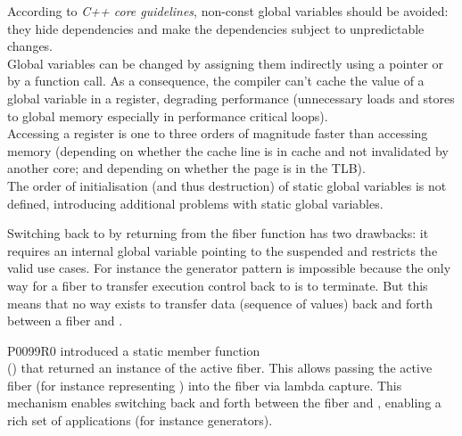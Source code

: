 \label{problem_gpub}

According to \emph{C++ core guidelines}\cite{coreguidlines}, non-const global
variables should be avoided: they hide dependencies and make the
dependencies subject to unpredictable changes.\\
Global variables can be changed by assigning them indirectly using a pointer or
by a function call. As a consequence, the compiler can't cache the value of a
global variable in a register, degrading performance (unnecessary
loads and stores to global memory especially in performance critical loops).\\
Accessing a register is one to three orders of magnitude faster than accessing
memory (depending on whether the cache line is in cache and not invalidated by
another core; and depending on whether the page is in the TLB).\\
The order of initialisation (and thus destruction) of static global
variables is not defined, introducing additional problems with static
global variables.\\


Switching back to \main by returning from the fiber function has two drawbacks:
it requires an internal global variable pointing to the suspended \main and
restricts the valid use cases.
For instance the generator pattern is impossible because the only way
for a fiber to transfer execution control back to \main is to terminate. But
this means that no way exists to transfer data (sequence of values) back and
forth between a fiber and \main.\\


P0099R0\cite{P0099R0} introduced a static member function\\
() that returned an instance of the active
fiber. This allows passing the active fiber  (for instance representing
\main) into the fiber  via lambda capture. This mechanism enables
switching back and forth between the fiber and \main, enabling a rich set of
applications (for instance generators).

